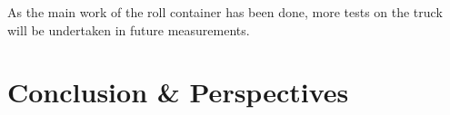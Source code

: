 %

As the main work of the roll container has been done, more tests on the truck will be undertaken in future measurements.


\section{Conclusion \& Perspectives}

